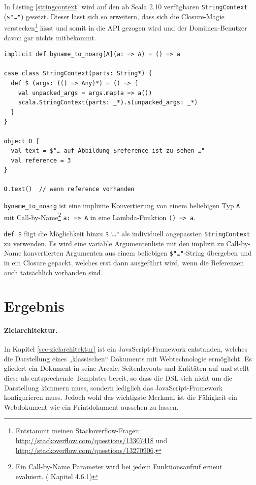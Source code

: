 In Listing \ref{stringcontext} wird auf den ab Scala 2.10 verfügbaren
\verb|StringContext| (\verb|s"…"|)
gesetzt. \cite{scala-stringInterpolation}
Dieser lässt sich so erweitern, dass
sich die Closure-Magie verstecken\footnote{Entstammt meinen
Stackoverflow-Fragen: \url{http://stackoverflow.com/questions/13307418} und
\url{http://stackoverflow.com/questions/13270906}.} lässt und somit in die API
gezogen wird und der Domänen-Benutzer davon gar nichts mitbekommt.

\begin{lstlisting}[label=stringcontext,caption=Erweiterter StringContext]
implicit def byname_to_noarg[A](a: => A) = () => a

case class StringContext(parts: String*) {
  def $ (args: (() => Any)*) = () => {
    val unpacked_args = args.map(a => a())
    scala.StringContext(parts: _*).s(unpacked_args: _*)
  }
}

object O {
  val text = $"… auf Abbildung $reference ist zu sehen …"
  val reference = 3
}

O.text()  // wenn reference vorhanden
\end{lstlisting}

\verb|byname_to_noarg| ist eine implizite Konvertierung von einem
beliebigen Typ \verb|A| mit Call-by-Name\footnote{Ein Call-by-Name
Parameter wird bei jedem Funktionsaufruf erneut evaluiert.
(\cite{scala-ref} Kapitel 4.6.1)}
\verb|a: => A| in eine Lambda-Funktion \verb|() => a|.

\verb|def $| fügt die Möglichkeit hinzu \verb|$"…"| als individuell
angepassten \verb|StringContext| zu verwenden. Es wird eine variable 
Argumentenliste mit den implizit zu Call-by-Name konvertierten Argumenten
aus einem beliebigen \verb|$"…"|-String übergeben und in ein Closure gepackt,
welches erst dann ausgeführt wird, wenn die Referenzen auch tatsächlich
vorhanden sind.


\section{Ergebnis}

\paragraph{Zielarchitektur.}
In Kapitel \ref{sec-zielarchitektur} ist ein JavaScript-Framework entstanden,
welches die Darstellung eines „klassischen“ Dokuments mit Webtechnologie
ermöglicht.
Es gliedert ein Dokument in seine Areale, Seitenlayouts und Entitäten auf
und stellt diese als entsprechende Templates bereit, so dass die DSL sich
nicht um die Darstellung kömmern muss, sondern lediglich das
JavaScript-Framework konfigurieren muss.
Jedoch wohl das wichtigste Merkmal ist die Fähigkeit ein Webdokument wie
ein Printdokument aussehen zu lassen.

